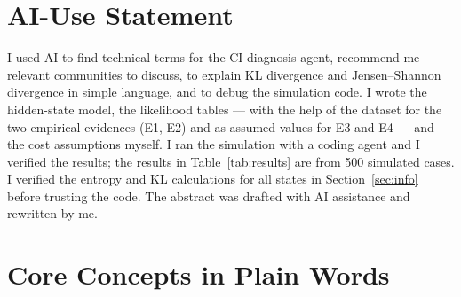 \documentclass{article}
\begin{document}
\section*{AI-Use Statement}

I used AI to find technical terms for the CI-diagnosis agent, recommend me relevant communities to discuss, to explain KL divergence and Jensen--Shannon divergence in simple language, and to debug the simulation code. I wrote the hidden-state model, the likelihood tables --- with the help of the dataset for the two empirical evidences (E1, E2) and as assumed values for E3 and E4 --- and the cost assumptions myself. I ran the simulation with a coding agent and I verified the results; the results in Table~\ref{tab:results} are from 500 simulated cases. I verified the entropy and KL calculations for all states in Section~\ref{sec:info} before trusting the code. The abstract was drafted with AI assistance and rewritten by me.




\appendix

\section{Core Concepts in Plain Words}
\label{app:concepts}
\end{document}
